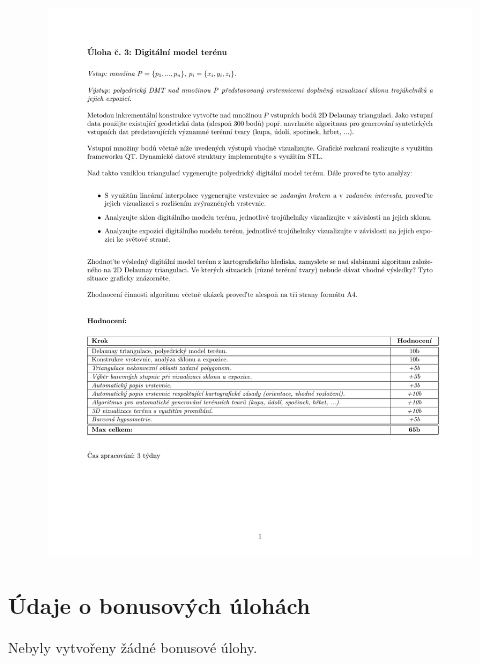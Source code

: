 \documentclass[a4paper, 12pt]{article}
\begin{document}
\begin{figure}[h!]
	\centering
	\includegraphics[clip, trim=0cm 5cm 0cm 0cm, width=1.2\textwidth]{zadani.pdf}
\end{figure}

\subsection{Údaje o bonusových úlohách}
Nebyly vytvořeny žádné bonusové úlohy.
\end{document}
